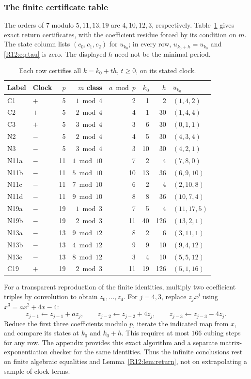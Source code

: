 \documentclass[11pt,a4paper]{article}
\theoremstyle{definition}\newtheorem{definition}[theorem]{Definition}
\theoremstyle{remark}\newtheorem{remark}[theorem]{Remark}
\begin{document}
\subsubsection{The finite certificate table}

The orders of $7$ modulo $5,11,13,19$ are $4,10,12,3$, respectively.
Table~\ref{R12:tab:returns} gives exact return certificates, with the
coefficient residue forced by its condition on $m$. The state column
lists $(c_0,c_1,c_2)$ for $u_{k_0}$; in every row,
$u_{k_0+h}=u_{k_0}$ and \eqref{R12:eq:tau} is zero. The displayed $h$
need not be the minimal period.

\begin{table}[htbp]
\centering
\small
\setlength{\tabcolsep}{5pt}
\begin{tabular}{llrrrrrl}
\toprule
Label & Clock & $p$ & $m$ class & $a\bmod p$ & $k_0$ & $h$ & $u_{k_0}$\\
\midrule
C1 & $+$ &5&$1\bmod4$&2&1&2&$(1,4,2)$\\
C2 & $+$ &5&$2\bmod4$&4&1&30&$(1,4,4)$\\
C3 & $+$ &5&$3\bmod4$&3&6&30&$(0,1,1)$\\
N2 & $-$ &5&$2\bmod4$&4&5&30&$(4,3,4)$\\
N3 & $-$ &5&$3\bmod4$&3&10&30&$(4,2,1)$\\
N11a & $-$ &11&$1\bmod10$&7&2&4&$(7,8,0)$\\
N11b & $-$ &11&$5\bmod10$&10&13&36&$(6,9,10)$\\
N11c & $-$ &11&$7\bmod10$&6&2&4&$(2,10,8)$\\
N11d & $-$ &11&$9\bmod10$&8&8&36&$(10,7,4)$\\
N19a & $-$ &19&$1\bmod3$&7&5&4&$(11,17,5)$\\
N19b & $-$ &19&$2\bmod3$&11&40&126&$(13,2,1)$\\
N13a & $-$ &13&$9\bmod12$&8&2&6&$(3,11,1)$\\
N13b & $-$ &13&$4\bmod12$&9&9&10&$(9,4,12)$\\
N13c & $-$ &13&$8\bmod12$&3&4&10&$(5,5,12)$\\
C19 & $+$ &19&$2\bmod3$&11&19&126&$(5,1,16)$\\
\bottomrule
\end{tabular}
\caption{Each row certifies all $k=k_0+th$, $t\ge0$, on its stated clock.}
\label{R12:tab:returns}
\end{table}

For a transparent reproduction of the finite identities, multiply
two coefficient triples by convolution to obtain $z_0,\ldots,z_4$.
For $j=4,3$, replace $z_jx^j$ using $x^3=ax^2+4x-4$:
\begin{equation}\label{R12:eq:reduction}
 z_{j-1}\leftarrow z_{j-1}+az_j,\qquad
 z_{j-2}\leftarrow z_{j-2}+4z_j,\qquad
 z_{j-3}\leftarrow z_{j-3}-4z_j.
\end{equation}
Reduce the first three coefficients modulo $p$, iterate the indicated
map from $x$, and compare its states at $k_0$ and $k_0+h$.
This requires at most $166$ cubing steps for any row. The appendix
provides this exact algorithm and a separate matrix-exponentiation
checker for the same identities. Thus the infinite conclusions rest
on finite algebraic equalities and Lemma~\ref{R12:lem:return}, not on
extrapolating a sample of clock terms.
\end{document}
